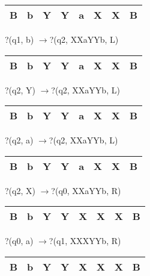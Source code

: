 \noindent 

\noindent 

\noindent 

\noindent 

\begin{tabular}{|p{0.2in}|p{0.2in}|p{0.2in}|p{0.2in}|p{0.2in}|p{0.2in}|p{0.2in}|p{0.2in}|} \hline 
B & b & Y & Y & a & X & X & B \\ \hline 
\end{tabular}

?(q1, b) $\to $?(q2, XXaYYb, L)

\noindent 

\begin{tabular}{|p{0.2in}|p{0.2in}|p{0.2in}|p{0.2in}|p{0.2in}|p{0.2in}|p{0.2in}|p{0.2in}|} \hline 
B & b & Y & Y & a & X & X & B \\ \hline 
\end{tabular}

?(q2, Y) $\to $?(q2, XXaYYb, L)

\noindent 

\begin{tabular}{|p{0.2in}|p{0.2in}|p{0.2in}|p{0.2in}|p{0.2in}|p{0.2in}|p{0.2in}|p{0.2in}|} \hline 
B & b & Y & Y & a & X & X & B \\ \hline 
\end{tabular}

?(q2, a) $\to $?(q2, XXaYYb, L)

\noindent 

\begin{tabular}{|p{0.2in}|p{0.2in}|p{0.2in}|p{0.2in}|p{0.2in}|p{0.2in}|p{0.2in}|p{0.2in}|} \hline 
B & b & Y & Y & a & X & X & B \\ \hline 
\end{tabular}

?(q2, X) $\to $?(q0, XXaYYb, R)

\noindent 

\begin{tabular}{|p{0.2in}|p{0.2in}|p{0.2in}|p{0.2in}|p{0.2in}|p{0.2in}|p{0.2in}|p{0.2in}|} \hline 
B & b & Y & Y & X & X & X & B \\ \hline 
\end{tabular}

?(q0, a) $\to $?(q1, XXXYYb, R)

\noindent 

\begin{tabular}{|p{0.2in}|p{0.2in}|p{0.2in}|p{0.2in}|p{0.2in}|p{0.2in}|p{0.2in}|p{0.2in}|} \hline 
B & b & Y & Y & X & X & X & B \\ \hline 
\end{tabular}

